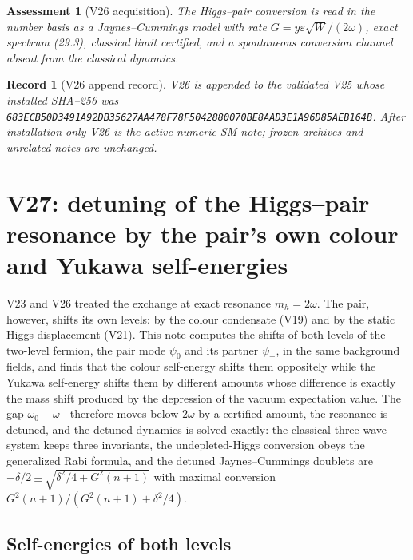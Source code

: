 \documentclass[11pt]{article}
\newtheorem{assessment}[theorem]{Assessment}
\newtheorem{record}[theorem]{Record}
\theoremstyle{remark}
\begin{document}
\begin{assessment}[V26 acquisition]
\label{ass:v20v26}
The Higgs--pair conversion is read in the number basis as a
Jaynes--Cummings model with rate \(G=y\varepsilon\sqrt W/(2\omega)\),
exact spectrum (29.3), classical limit certified, and a spontaneous
conversion channel absent from the classical dynamics.
\end{assessment}

\begin{record}[V26 append record]
\label{rec:v20v26}
V26 is appended to the validated V25 whose installed SHA--256 was
\texttt{683ECB50D3491A92DB35627AA478F78F5042880070BE8AAD3E1A96D85AEB164B}.
After installation only V26 is the active numeric SM note; frozen
archives and unrelated notes are unchanged.
\end{record}


\section{V27: detuning of the Higgs--pair resonance by the pair's own colour and Yukawa self-energies}
\label{sec:v20v27}

V23 and V26 treated the exchange at exact resonance \(m_h=2\omega\).
The pair, however, shifts its own levels: by the colour condensate
(V19) and by the static Higgs displacement (V21).  This note computes
the shifts of both levels of the two-level fermion, the pair mode
\(\psi_0\) and its partner \(\psi_-\), in the same background fields,
and finds that the colour self-energy shifts them oppositely while
the Yukawa self-energy shifts them by different amounts whose
difference is exactly the mass shift produced by the depression of
the vacuum expectation value.  The gap \(\omega_0-\omega_-\) therefore
moves below \(2\omega\) by a certified amount, the resonance is
detuned, and the detuned dynamics is solved exactly: the classical
three-wave system keeps three invariants, the undepleted-Higgs
conversion obeys the generalized Rabi formula, and the detuned
Jaynes--Cummings doublets are \(-\delta/2\pm\sqrt{\delta^2/4+G^2(n+1)}\)
with maximal conversion \(G^2(n+1)/(G^2(n+1)+\delta^2/4)\).

\subsection{Self-energies of both levels}
\end{document}
